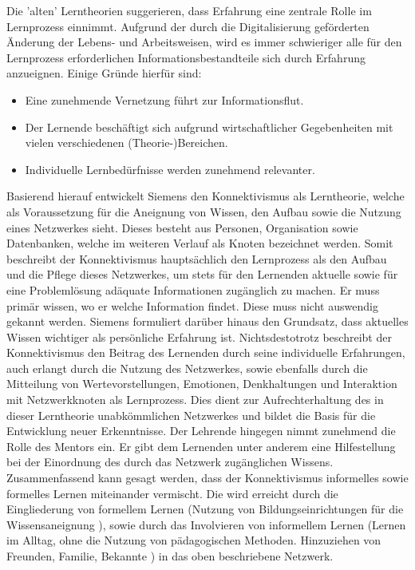 Die 'alten' Lerntheorien suggerieren, dass Erfahrung eine zentrale Rolle im Lernprozess einnimmt. Aufgrund der durch die Digitalisierung geförderten Änderung der Lebens- und Arbeitsweisen, wird es immer schwieriger alle für den Lernprozess erforderlichen Informationsbestandteile sich durch Erfahrung anzueignen.\cite[S. 159ff.]{Erpenbeck.2007} Einige Gründe hierfür sind:
\begin{itemize}
	\item Eine zunehmende Vernetzung führt zur Informationsflut. 
	\item Der Lernende beschäftigt sich aufgrund wirtschaftlicher Gegebenheiten mit vielen verschiedenen (Theorie-)Bereichen.
	\item Individuelle Lernbedürfnisse werden zunehmend relevanter.
\end{itemize}
Basierend hierauf entwickelt Siemens den Konnektivismus als Lerntheorie, welche als Voraussetzung für die Aneignung von Wissen, den Aufbau sowie die Nutzung eines Netzwerkes sieht. Dieses besteht aus Personen, Organisation sowie Datenbanken, welche im weiteren Verlauf als Knoten bezeichnet werden. Somit beschreibt der Konnektivismus hauptsächlich den Lernprozess als den Aufbau und die Pflege dieses Netzwerkes, um stets für den Lernenden aktuelle sowie für eine Problemlösung adäquate Informationen zugänglich zu machen. Er muss primär wissen, wo er welche Information findet. Diese muss nicht auswendig gekannt werden. Siemens formuliert darüber hinaus den Grundsatz, dass aktuelles Wissen wichtiger als persönliche Erfahrung ist. Nichtsdestotrotz beschreibt der Konnektivismus den Beitrag des Lernenden durch seine individuelle Erfahrungen, auch erlangt durch die Nutzung des Netzwerkes, sowie ebenfalls durch die Mitteilung von Wertevorstellungen, Emotionen, Denkhaltungen und Interaktion mit Netzwerkknoten als Lernprozess. Dies dient zur Aufrechterhaltung des in dieser Lerntheorie unabkömmlichen Netzwerkes und bildet die Basis für die Entwicklung neuer Erkenntnisse. Der Lehrende hingegen nimmt zunehmend die Rolle des Mentors ein. Er gibt dem Lernenden unter anderem eine Hilfestellung bei der Einordnung des durch das Netzwerk zugänglichen Wissens. Zusammenfassend kann gesagt werden, dass der Konnektivismus informelles sowie formelles Lernen miteinander vermischt.\cite[S. 47ff.]{Kuhlmann.2008} Die wird erreicht durch die Eingliederung von formellem Lernen (Nutzung von Bildungseinrichtungen für die Wissensaneignung \cite[S. 75]{Hellmer.2007}), sowie durch das Involvieren von informellem Lernen (Lernen im Alltag, ohne die Nutzung von pädagogischen Methoden. Hinzuziehen von Freunden, Familie, Bekannte \cite[S. 76]{Hellmer.2007}) in das oben beschriebene Netzwerk.  


